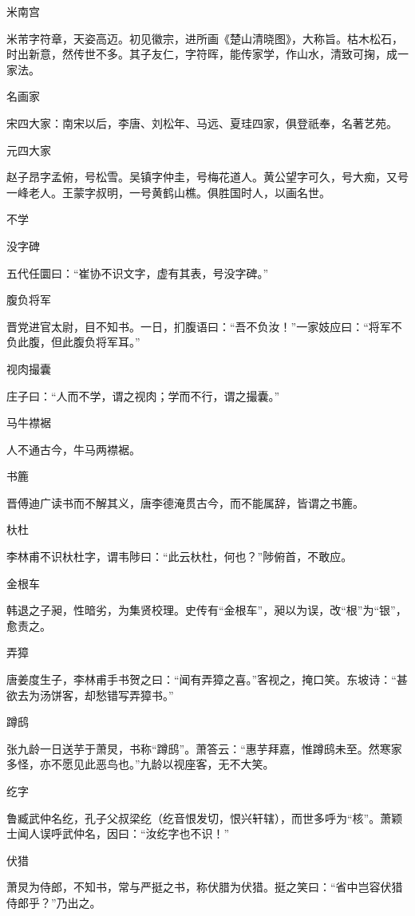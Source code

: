 \documentclass[a4paper,12pt,UTF8,twoside]{ctexbook}
\begin{document}
    米南宫
    
    米芾字符章，天姿高迈。初见徽宗，进所画《楚山清晓图》，大称旨。枯木松石，时出新意，然传世不多。其子友仁，字符晖，能传家学，作山水，清致可掬，成一家法。
    
    名画家
    
    宋四大家：南宋以后，李唐、刘松年、马远、夏珪四家，俱登祇奉，名著艺苑。
    
    元四大家
    
    赵子昂字孟俯，号松雪。吴镇字仲圭，号梅花道人。黄公望字可久，号大痴，又号一峰老人。王蒙字叔明，一号黄鹤山樵。俱胜国时人，以画名世。
    
    不学
    
    没字碑
    
    五代任圜曰：“崔协不识文字，虚有其表，号没字碑。”
    
    腹负将军
    
    晋党进官太尉，目不知书。一日，扪腹语曰：“吾不负汝！”一家妓应曰：“将军不负此腹，但此腹负将军耳。”
    
    视肉撮囊
    
    庄子曰：“人而不学，谓之视肉；学而不行，谓之撮囊。”
    
    马牛襟裾
    
    人不通古今，牛马两襟裾。
    
    书簏
    
    晋傅迪广读书而不解其义，唐李德淹贯古今，而不能属辞，皆谓之书簏。
    
    杕杜
    
    李林甫不识杕杜字，谓韦陟曰：“此云杕杜，何也？”陟俯首，不敢应。
    
    金根车
    
    韩退之子昶，性暗劣，为集贤校理。史传有“金根车”，昶以为误，改“根”为“银”，愈责之。
    
    弄獐
    
    唐姜度生子，李林甫手书贺之曰：“闻有弄獐之喜。”客视之，掩口笑。东坡诗：“甚欲去为汤饼客，却愁错写弄獐书。”
    
    蹲鸱
    
    张九龄一日送芋于萧炅，书称“蹲鸱”。萧答云：“惠芋拜嘉，惟蹲鸱未至。然寒家多怪，亦不愿见此恶鸟也。”九龄以视座客，无不大笑。
    
    纥字
    
    鲁臧武仲名纥，孔子父叔梁纥（纥音恨发切，恨兴轩辖），而世多呼为“核”。萧颖士闻人误呼武仲名，因曰：“汝纥字也不识！”
    
    伏猎
    
    萧炅为侍郎，不知书，常与严挺之书，称伏腊为伏猎。挺之笑曰：“省中岂容伏猎侍郎乎？”乃出之。
    
\end{document}
